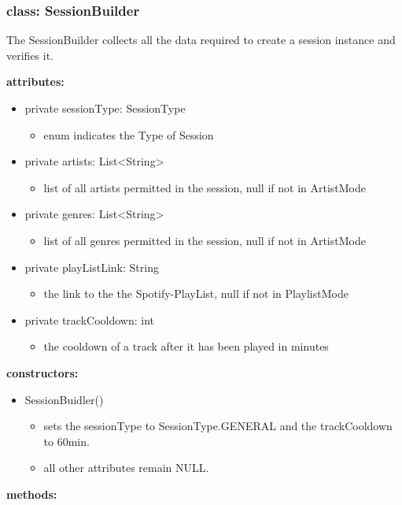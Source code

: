 \documentclass[oneside, ngerman]{sdqtechreport}
\begin{document}
\subsubsection{class: SessionBuilder}
The SessionBuilder collects all the data required to create a session instance and verifies it.

\textbf{attributes:}
\begin{itemize}
    \item private sessionType: SessionType
    \begin{itemize}
        \item enum indicates the Type of Session
    \end{itemize}
    \item private artists: List<String>
    \begin{itemize}
        \item list of all artists permitted in the session, null if not in ArtistMode
    \end{itemize}
    \item private genres: List<String>
    \begin{itemize}
        \item list of all genres permitted in the session, null if not in ArtistMode
    \end{itemize}
    \item private playListLink: String
    \begin{itemize}
        \item the link to the the Spotify-PlayList, null if not in PlaylistMode
    \end{itemize}
    \item private trackCooldown: int
    \begin{itemize}
        \item the cooldown of a track after it has been played in minutes
    \end{itemize}
\end{itemize}
\textbf{constructors:}
\begin{itemize}
    \item SessionBuidler()
    \begin{itemize}
        \item sets the sessionType to SessionType.GENERAL and the trackCooldown to 60min.
        \item all other attributes remain NULL.
    \end{itemize}
\end{itemize}
\textbf{methods:}
\end{document}
